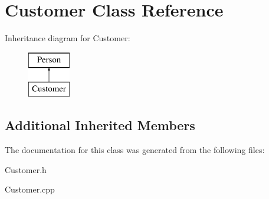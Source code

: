 \hypertarget{class_customer}{}\section{Customer Class Reference}
\label{class_customer}
Inheritance diagram for Customer\+:\begin{figure}[H]
\begin{center}
\leavevmode
\includegraphics[height=2.000000cm]{class_customer}
\end{center}
\end{figure}
\subsection*{Additional Inherited Members}


The documentation for this class was generated from the following files\+:\begin{DoxyCompactItemize}
\item 
Customer.\+h\item 
Customer.\+cpp\end{DoxyCompactItemize}
